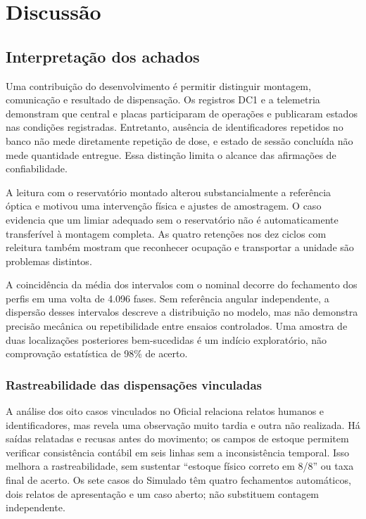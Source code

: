 \section{Discussão}\label{cap:discussao}
\subsection{Interpretação dos achados}
Uma contribuição do desenvolvimento é permitir distinguir montagem, comunicação e resultado de dispensação. Os registros DC1 e a telemetria demonstram que central e placas participaram de operações e publicaram estados nas condições registradas. Entretanto, ausência de identificadores repetidos no banco não mede diretamente repetição de dose, e estado de sessão concluída não mede quantidade entregue. Essa distinção limita o alcance das afirmações de confiabilidade. 

A leitura com o reservatório montado alterou substancialmente a referência óptica e motivou uma intervenção física e ajustes de amostragem. O caso evidencia que um limiar adequado sem o reservatório não é automaticamente transferível à montagem completa. As quatro retenções nos dez ciclos com releitura também mostram que reconhecer ocupação e transportar a unidade são problemas distintos. 

A coincidência da média dos intervalos com o nominal decorre do fechamento dos perfis em uma volta de 4.096 fases. Sem referência angular independente, a dispersão desses intervalos descreve a distribuição no modelo, mas não demonstra precisão mecânica ou repetibilidade entre ensaios controlados. Uma amostra de duas localizações posteriores bem-sucedidas é um indício exploratório, não comprovação estatística de 98\% de acerto.

\subsubsection{Rastreabilidade das dispensações vinculadas}
A análise dos oito casos vinculados no Oficial relaciona relatos humanos e identificadores, mas revela uma observação muito tardia e outra não realizada. Há saídas relatadas e recusas antes do movimento; os campos de estoque permitem verificar consistência contábil em seis linhas sem a inconsistência temporal. Isso melhora a rastreabilidade, sem sustentar ``estoque físico correto em 8/8'' ou taxa final de acerto. Os sete casos do Simulado têm quatro fechamentos automáticos, dois relatos de apresentação e um caso aberto; não substituem contagem independente. 

